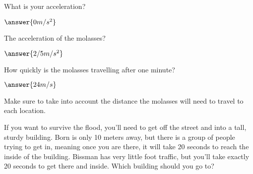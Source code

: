 \documentclass{ximera}
\begin{document}
\begin{question}
What is your acceleration?

$\answer{0 m/s^2}$

The acceleration of the molasses?

$\answer{2/5 m/s^2}$
\end{question}
\begin{question}
How quickly is the molasses travelling after one minute?

$\answer{24m/s}$
\end{question}
\begin{question}
\begin{hint}
Make sure to take into account the distance the molasses will need to travel to each location.
\end{hint}If you want to survive the flood, you'll need to get off the street and into a tall, sturdy building. Born is only 10 meters away, but there is a group of people trying to get in, meaning once you are there, it will take 20 seconds to reach the inside of the building. Bissman has very little foot traffic, but you'll take exactly 20 seconds to get there and inside. Which building should you go to? \begin{multipleChoice}
\end{multipleChoice}\end{question}

\setcounter{problem}{0}
\end{document}
